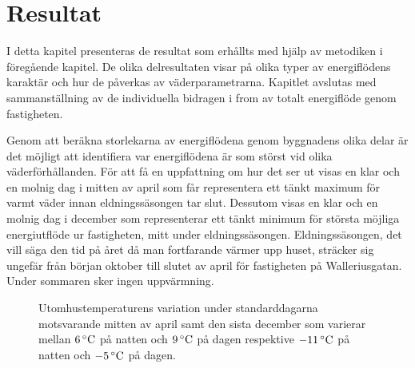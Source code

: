\chapter{Resultat}

I detta kapitel presenteras de resultat som erhållts med hjälp av metodiken i föregående kapitel. De olika delresultaten visar på olika typer av energiflödens karaktär och hur de påverkas av väderparametrarna. Kapitlet avslutas med sammanställning av de individuella bidragen i from av totalt energiflöde genom fastigheten.

Genom att beräkna storlekarna av energiflödena genom byggnadens olika delar är det möjligt att identifiera var energiflödena är som störst vid olika väderförhållanden. För att få en uppfattning om hur det ser ut visas en klar och en molnig dag i mitten av april som får representera ett tänkt maximum för varmt väder innan eldningssäsongen tar slut. Dessutom visas en klar och en molnig dag i december som representerar ett tänkt minimum för största möjliga energiutflöde ur fastigheten, mitt under eldningssäsongen. Eldningssäsongen, det vill säga den tid på året då man fortfarande värmer upp huset, sträcker sig ungefär från början oktober till slutet av april för fastigheten på Walleriusgatan. Under sommaren sker ingen uppvärmning.


\begin{figure}[hpbt]
\centering

\vspace{1cm}

\caption{\label{fig:temperaturedist} Utomhustemperaturens variation under standarddagarna motsvarande mitten av april samt den sista december som varierar mellan $\unit[6]{^\circ C}$ på natten och $\unit[9]{^\circ C}$ på dagen respektive $\unit[-11]{^\circ C}$ på natten och $\unit[-5]{^\circ C}$ på dagen.
}
\end{figure}

